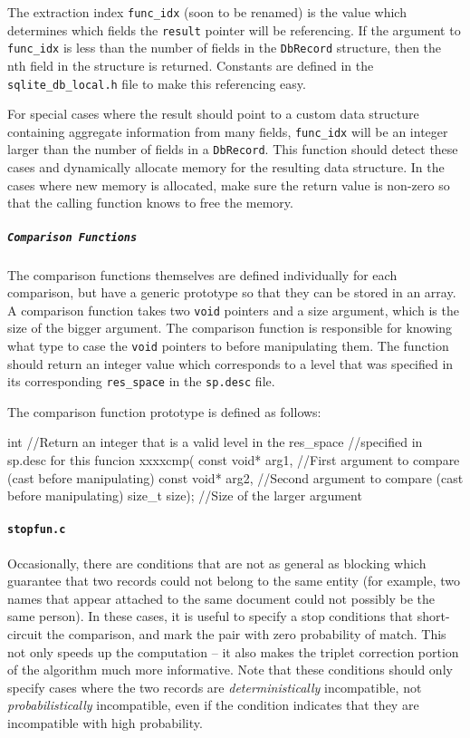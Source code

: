 \documentclass[10pt, letterpaper]{article}
\begin{document}
The extraction index \texttt{func\_idx} (soon to be renamed) is the value which determines which fields the \texttt{result} pointer will be referencing. 
If the argument to \texttt{func\_idx} is less than the number of fields in the \texttt{DbRecord} structure, then the nth field in the structure is returned.
Constants are defined in the \texttt{sqlite\_db\_local.h} file to make this referencing easy.

For special cases where the result should point to a custom data structure containing aggregate information from many fields, \texttt{func\_idx} will be an integer larger than the number of fields in a \texttt{DbRecord}.
This function should detect these cases and dynamically allocate memory for the resulting data structure.
In the cases where new memory is allocated, make sure the return value is non-zero so that the calling function knows to free the memory.
\subparagraph{\texttt{Comparison Functions}}
The comparison functions themselves are defined individually for each comparison, but have a generic prototype so that they can be stored in an array. A comparison function takes two \texttt{void} pointers and a size argument, which is the size of the bigger argument.
The comparison function is responsible for knowing what type to case the \texttt{void} pointers to before manipulating them.
The function should return an integer value which corresponds to a level that was specified in its corresponding \texttt{res\_space} in the \texttt{sp.desc} file.

The comparison function prototype is defined as follows:
\begin{verbatimtab}
int                        //Return an integer that is a valid level in the res_space
                           //specified in sp.desc for this funcion
xxxxcmp( const void* arg1, //First argument to compare (cast before manipulating)
         const void* arg2, //Second argument to compare (cast before manipulating)
         size_t size);     //Size of the larger argument
\end{verbatimtab}
\paragraph{\texttt{stopfun.c}}
Occasionally, there are conditions that are not as general as blocking which guarantee that two records could not
belong to the same entity (for example, two names that appear attached to the same document could not possibly be
the same person). In these cases, it is useful to specify a stop conditions that short-circuit the comparison, and mark
the pair with zero probability of match. This not only speeds up the computation -- it also makes the triplet correction
portion of the algorithm much more informative. Note that these conditions should only specify cases where the two records
are \emph{deterministically} incompatible, not \emph{probabilistically} incompatible, even if the condition indicates
that they are incompatible with high probability.
\end{document}
